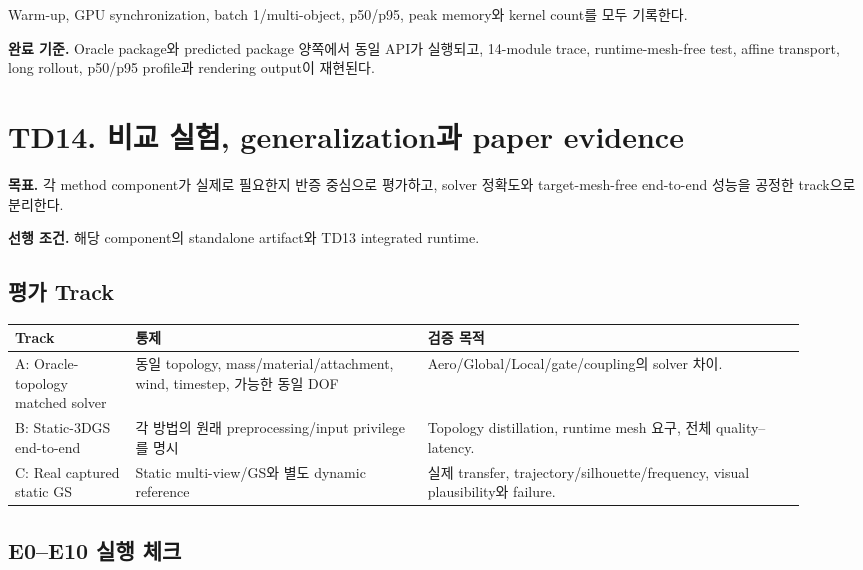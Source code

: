 \documentclass[10pt,a4paper]{article}
\begin{document}
Warm-up, GPU synchronization, batch 1/multi-object, p50/p95, peak memory와 kernel count를 모두 기록한다.

\textbf{완료 기준.}
Oracle package와 predicted package 양쪽에서 동일 API가 실행되고,
14-module trace, runtime-mesh-free test, affine transport, long rollout, p50/p95 profile과 rendering output이 재현된다.

\section{TD14. 비교 실험, generalization과 paper evidence}

\textbf{목표.}
각 method component가 실제로 필요한지 반증 중심으로 평가하고,
solver 정확도와 target-mesh-free end-to-end 성능을 공정한 track으로 분리한다.

\textbf{선행 조건.} 해당 component의 standalone artifact와 TD13 integrated runtime.

\subsection*{평가 Track}

\begin{longtable}{L{0.14\linewidth}L{0.34\linewidth}L{0.44\linewidth}}
\toprule
Track & 통제 & 검증 목적 \\
\midrule
A: Oracle-topology matched solver & 동일 topology, mass/material/attachment, wind, timestep, 가능한 동일 DOF & Aero/Global/Local/gate/coupling의 solver 차이. \\
B: Static-3DGS end-to-end & 각 방법의 원래 preprocessing/input privilege를 명시 & Topology distillation, runtime mesh 요구, 전체 quality--latency. \\
C: Real captured static GS & Static multi-view/GS와 별도 dynamic reference & 실제 transfer, trajectory/silhouette/frequency, visual plausibility와 failure. \\
\bottomrule
\end{longtable}

\subsection*{E0--E10 실행 체크}
\end{document}
